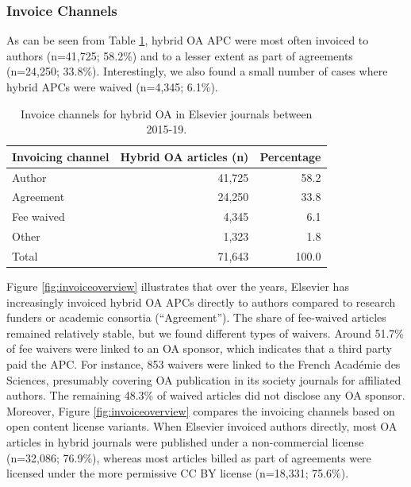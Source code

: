 \documentclass[a4paper,man,floatsintext,longtable,noextraspace,12pt]{apa6}
\begin{document}
\hypertarget{invoice-channels}{%
\subsubsection*{Invoice Channels}\label{invoice-channels}}

As can be seen from Table \ref{tab:invoicing_overview}, hybrid OA APC
were most often invoiced to authors (n=41,725; 58.2\%) and to a lesser
extent as part of agreements (n=24,250; 33.8\%). Interestingly, we also
found a small number of cases where hybrid APCs were waived (n=4,345;
6.1\%).

\begin{table}

\caption{\label{tab:invoicing_overview}Invoice channels for hybrid OA in Elsevier journals between 2015-19.}
\centering
\begin{tabular}[t]{lrr}
\toprule
Invoicing channel & Hybrid OA articles (n) & Percentage\\
\midrule
Author & 41,725 & 58.2\\
Agreement & 24,250 & 33.8\\
Fee waived & 4,345 & 6.1\\
Other & 1,323 & 1.8\\
\midrule
Total & 71,643 & 100.0\\
\bottomrule
\end{tabular}
\end{table}

Figure \ref{fig:invoiceoverview} illustrates that over the years,
Elsevier has increasingly invoiced hybrid OA APCs directly to authors
compared to research funders or academic consortia (``Agreement''). The
share of fee-waived articles remained relatively stable, but we found
different types of waivers. Around 51.7\% of fee waivers were linked to
an OA sponsor, which indicates that a third party paid the APC. For
instance, 853 waivers were linked to the French Académie des Sciences,
presumably covering OA publication in its society journals for
affiliated authors. The remaining 48.3\% of waived articles did not
disclose any OA sponsor. Moreover, Figure \ref{fig:invoiceoverview}
compares the invoicing channels based on open content license variants.
When Elsevier invoiced authors directly, most OA articles in hybrid
journals were published under a non-commercial license (n=32,086;
76.9\%), whereas most articles billed as part of agreements were
licensed under the more permissive CC BY license (n=18,331; 75.6\%).
\end{document}
